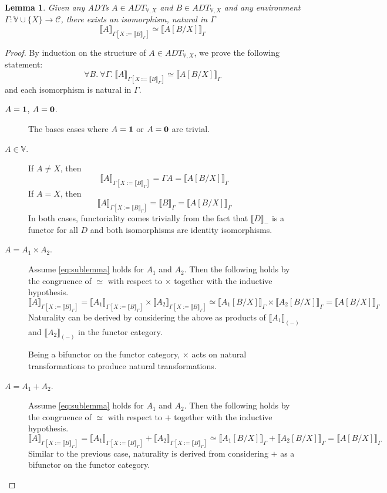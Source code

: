 \documentclass{msthesis}
\newtheorem{lemma}[theorem]{Lemma}
\theoremstyle{definition}
\newcommand{\semof}[1]{\llbracket{#1}\rrbracket}
\newcommand{\mcC}{\mathcal{C}}
\newcommand{\vars}{\mathbb{V}}
\begin{document}

\begin{lemma} \label{lemma:semofsub}
    Given any ADTs $A \in ADT_{\vars,X}$ and $B \in ADT_{\vars,X}$ and any environment $\Gamma : \vars \cup \{X\} \to \mcC$,
    there exists an isomorphism, natural in $\Gamma$
    \[ \semof{A}_{\Gamma[X:=\semof{B}_\Gamma]} \simeq \semof{A[B/X]}_\Gamma \]
\end{lemma}

\begin{proof}
    By induction on the structure of $A \in ADT_{\vars,X}$, we prove the following statement:
    \begin{equation}
    \label{eq:sublemma}
        \forall B.\ \forall \Gamma.\  \semof{A}_{\Gamma[X:=\semof{B}_\Gamma]} \simeq \semof{A[B/X]}_\Gamma
    \end{equation}
    and each isomorphism is natural in $\Gamma$.
    \begin{description}
    \item[$A = \mathbf{1}$, $A = \mathbf{0}$.] The bases cases where $A = \mathbf{1}$ or $A = \mathbf{0}$ are trivial.
    \item[$A \in \vars$.]  If $A \neq X$, then
    \[ \semof{A}_{\Gamma[X:=\semof{B}_\Gamma]} = \Gamma A = \semof{A[B/X]}_\Gamma \]
    If $A = X$, then
    \[ \semof{A}_{\Gamma[X:=\semof{B}_\Gamma]} = \semof{B}_\Gamma = \semof{A[B/X]}_\Gamma \]
    In both cases, functoriality comes trivially from the fact that $\semof{D}_-$ is a functor for all $D$ and both isomorphisms are identity isomorphisms.
    \item[$A = A_1 \times A_2$.]  Assume \eqref{eq:sublemma} holds for $A_1$ and $A_2$.
    Then the following holds by the congruence of $\simeq$ with respect to $\times$ together with the inductive hypothesis.
    \[ \semof{A}_{\Gamma[X:=\semof{B}_\Gamma]} = \semof{A_1}_{\Gamma[X:=\semof{B}_\Gamma]} 
    \times \semof{A_2}_{\Gamma[X:=\semof{B}_\Gamma]} \simeq \semof{A_1[B/X]}_\Gamma \times \semof{A_2[B/X]}_\Gamma = \semof{A[B/X]}_\Gamma \]
    Naturality can be derived by considering the above as products of $\semof{A_1}_{(-)}$ and $\semof{A_2}_{(-)}$ in the functor category.

    Being a bifunctor on the functor category, $\times$ acts on natural transformations to produce natural transformations.
    \item[$A = A_1 + A_2$.]  Assume \eqref{eq:sublemma} holds for $A_1$ and $A_2$.
    Then the following holds by the congruence of $\simeq$ with respect to $+$ together with the inductive hypothesis.
    \[ \semof{A}_{\Gamma[X:=\semof{B}_\Gamma]} = \semof{A_1}_{\Gamma[X:=\semof{B}_\Gamma]} 
    + \semof{A_2}_{\Gamma[X:=\semof{B}_\Gamma]} \simeq \semof{A_1[B/X]}_\Gamma + \semof{A_2[B/X]}_\Gamma = \semof{A[B/X]}_\Gamma \]
    Similar to the previous case, naturality is derived from considering $+$ as a bifunctor on the functor category.
    

\end{description}
\end{proof}
\end{document}
